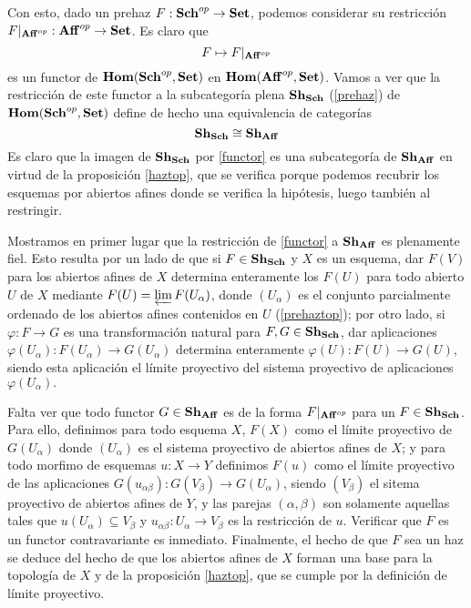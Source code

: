 \documentclass[twoside]{article}
\begin{document}
Con esto, dado un prehaz $F:\mathrm{\mathbf{Sch}}^{op}\to \mathrm{\mathbf{Set}}$, podemos considerar su restricción $F|_{\mathrm{\mathbf{Aff}}^{op}}:\mathrm{\mathbf{Aff}}^{op}\to\mathrm{\mathbf{Set}}$. Es claro que
\begin{equation}\label{functor}
F\mapsto F|_{\mathrm{\mathbf{Aff}}^{op}}
\end{equation}
es un functor de $\mathrm{\mathbf{Hom}}(\mathrm{\mathbf{Sch}}^{op},\mathrm{\mathbf{Set}})$ en $\mathrm{\mathbf{Hom}}(\mathrm{\mathbf{Aff}}^{op},\mathrm{\mathbf{Set}})$. Vamos a ver que la restricción de este functor a la subcategoría plena $\mathrm{\mathbf{Sh}}_{\mathrm{\mathbf{Sch}}}$ (\ref{prehaz}) de $\mathrm{\mathbf{Hom}}(\mathrm{\mathbf{Sch}}^{op},\mathrm{\mathbf{Set}})$ define de hecho una equivalencia de categorías 
\begin{equation}\label{equivalencia}
\mathrm{\mathbf{Sh}}_{\mathrm{\mathbf{Sch}}}\cong\mathrm{\mathbf{Sh}}_{\mathrm{\mathbf{Aff}}}
\end{equation}
Es claro que la imagen de $\mathrm{\mathbf{Sh}}_{\mathrm{\mathbf{Sch}}}$ por \ref{functor} es una subcategoría de $\mathrm{\mathbf{Sh}}_{\mathrm{\mathbf{Aff}}}$ en virtud de la proposición \ref{haztop}, que se verifica porque podemos recubrir los esquemas por abiertos afines donde se verifica la hipótesis, luego también al restringir. %

Mostramos en primer lugar que la restricción de \ref{functor} a $\mathrm{\mathbf{Sh}}_{\mathrm{\mathbf{Aff}}}$ es plenamente fiel. Esto resulta por un lado de que si $F\in \mathrm{\mathbf{Sh}}_{\mathrm{\mathbf{Sch}}}$ y $X$ es un esquema, dar $F(V)$ para los abiertos afines de $X$ determina enteramente los $F(U)$ para todo abierto $U$ de $X$ mediante $F(U)=\varprojlim F(U_\alpha)$, donde $(U_\alpha)$ es el conjunto parcialmente ordenado de los abiertos afines contenidos en $U$ (\ref{prehaztop}); %
 por otro lado, si $\varphi:F\to G$ es una transformación natural para $F,G\in \mathrm{\mathbf{Sh}}_{\mathrm{\mathbf{Sch}}}$, dar aplicaciones $\varphi(U_\alpha):F(U_\alpha)\to G(U_\alpha)$ determina enteramente $\varphi(U):F(U)\to G(U)$, siendo esta aplicación el límite proyectivo del sistema proyectivo de aplicaciones $\varphi(U_\alpha).$%
 
 Falta ver que todo functor $G\in\mathrm{\mathbf{Sh}}_{\mathrm{\mathbf{Aff}}}$ es de la forma $F|_{\mathrm{\mathbf{Aff}}^{op}}$ para un $F\in \mathrm{\mathbf{Sh}}_{\mathrm{\mathbf{Sch}}}$. Para ello, definimos para todo esquema $X$, $F(X)$ como el límite proyectivo de $G(U_\alpha)$ donde $(U_\alpha)$ es el sistema proyectivo de abiertos afines de $X$; y para todo morfimo de esquemas $u:X\to Y$ definimos $F(u)$ como el límite proyectivo de las aplicaciones $G(u_{\alpha\beta}):G(V_\beta)\to G(U_\alpha)$, siendo $(V_\beta)$ el sitema proyectivo de abiertos afines de $Y$, y las parejas $(\alpha,\beta)$ son solamente aquellas tales que $u(U_\alpha)\subseteq V_\beta$ y $u_{\alpha\beta}:U_\alpha\to V_\beta$ es la restricción de $u$. Verificar que $F$ es un functor contravariante es inmediato. Finalmente, el hecho de que $F$ sea un haz se deduce del hecho de que los abiertos afines de $X$ forman una base para la topología de $X$ y de la proposición \ref{haztop}, que se cumple por la definición de límite proyectivo.%
 
\end{document}
